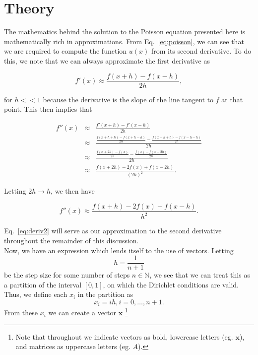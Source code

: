 \documentclass[12pt]{article}
\numberwithin{equation}{section}
\begin{document}
\section{Theory}
\label{sec:theory}
The mathematics behind the solution to the Poisson equation presented here is mathematically rich in approximations.  From Eq.~\ref{eq:poisson}, we can see that we are required to compute the function $u\left(x\right)$ from its second derivative.  To do this, we note that we can always approximate the first derivative as

\begin{equation}
\label{eq:deriv1}
f'\left(x\right) \approx \frac{f\left(x+h\right)-f\left(x-h\right)}{2h},
\end{equation}

\noindent for $h<<1$ because the derivative is the slope of the line tangent to $f$ at that point.  This then implies that

$$\begin{array}{ccc} f''\left(x\right)&\approx&\frac{f'\left(x+h\right)-f'\left(x-h\right)}{2h} \\
&\approx&\frac{\frac{f\left(x+h+h\right)-f\left(x+h-h\right)}{2h} - \frac{f\left(x-h+h\right)-f\left(x-h-h\right)}{2h}}{2h} \\
&\approx&\frac{\frac{f\left(x+2h\right)-f\left(x\right)}{2h} - \frac{f\left(x\right)-f\left(x-2h\right)}{2h}}{2h} \\
&\approx&\frac{f\left(x+2h\right)-2f\left(x\right)+f\left(x-2h\right)}{\left(2h\right)^{2}}.\end{array}$$

\noindent Letting $2h\rightarrow h$, we then have

\begin{equation}
\label{eq:deriv2}
f''\left(x\right)\approx\frac{f\left(x+h\right)-2f\left(x\right)+f\left(x-h\right)}{h^{2}}.
\end{equation}

\noindent Eq.~\ref{eq:deriv2} will serve as our approximation to the second derivative throughout the remainder of this discussion.  
\\\indent Now, we have an expression which lends itself to the use of vectors.  Letting $$h = \frac{1}{n+1}$$ be the step size for some number of steps $n\in\mathbb{N}$, we see that we can treat this as a partition of the interval $\left[0,1\right]$, on which the Dirichlet conditions are valid.  Thus, we define each $x_{i}$ in the partition as $$x_{i}=ih,i=0,\ldots,n+1.$$  From these $x_{i}$ we can create a vector $\textbf{x}$ \footnote{Note that throughout we indicate vectors as bold, lowercase letters (eg. $\textbf{x}$), and matrices as uppercase letters (eg. $A$).}
\end{document}
